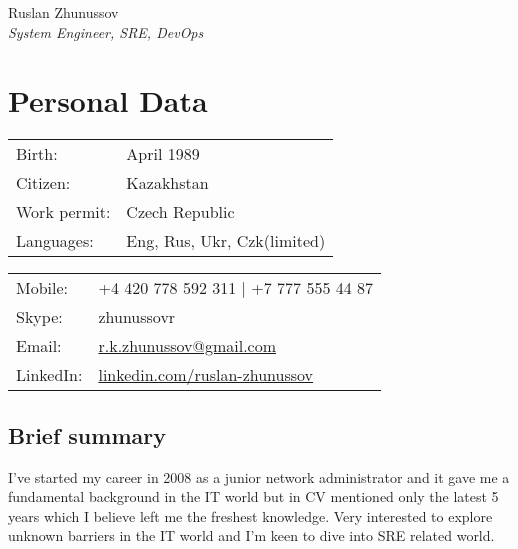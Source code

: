 \documentclass[a4paper,10pt]{article}
\def\name{Ruslan Zhunussov}
\begin{document}
{\huge \name \\}
\textit{System Engineer, SRE, DevOps}

\section*{Personal Data}
\begin{minipage}{0.45\linewidth}
    \begin{tabular}{ll}
        Birth: &  April 1989\\
        Citizen: &  Kazakhstan \\
        Work permit: & Czech Republic \\
        Languages: & Eng, Rus, Ukr, Czk(limited) \\
      \end{tabular}
\end{minipage}
\begin{minipage}{0.45\linewidth}
    \begin{tabular}{ll}
      Mobile: & +4 420 778 592 311 | +7 777 555 44 87 \\
      Skype: &  zhunussovr \\
      Email: & \href{mailto:r.k.zhunussov@gmail.com}{r.k.zhunussov@gmail.com} \\
      LinkedIn: & \href{https://www.linkedin.com/in/ruslan-zhunussov-6b575a5a}{linkedin.com/ruslan-zhunussov} \\
    \end{tabular}
\end{minipage}

\subsection*{Brief summary}
\textnormal{I've started my career in 2008 as a junior network administrator and it gave me a fundamental background in the IT world but in CV mentioned only the latest 5 years which I believe left me the freshest knowledge. Very interested to explore unknown barriers in the IT world and I'm keen to dive into SRE related world.}
\end{document}
